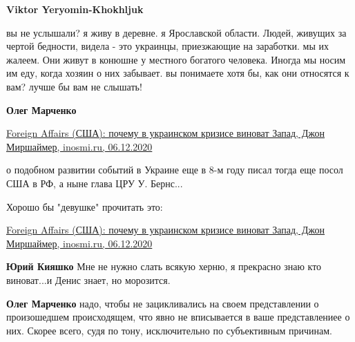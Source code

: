 \begin{itemize}
\begin{itemize}
\textbf{Viktor Yeryomin-Khokhljuk} 

вы не услышали? я живу в деревне. я Ярославской области. Людей, живущих за
чертой бедности, видела - это украинцы, приезжающие на заработки. мы их жалеем.
Они живут в конюшне у местного богатого человека. Иногда мы носим им еду, когда
хозяин о них забывает. вы понимаете хотя бы, как они относятся к вам? лучше бы
вам не слышать!


 
\textbf{Олег Марченко} 

\href{https://inosmi.ru/politic/20201206/222742551.html}{%
Foreign Affairs (США): почему в украинском кризисе виноват Запад, Джон Миршаймер, inosmi.ru, 06.12.2020%
}

о подобном развитии событий в Украине еще в 8-м году писал тогда еще посол США
в РФ, а ныне глава ЦРУ У. Бернс...

 
Хорошо бы "девушке" прочитать это:

\href{https://inosmi.ru/politic/20201206/222742551.html}{%
Foreign Affairs (США): почему в украинском кризисе виноват Запад, Джон Миршаймер, inosmi.ru, 06.12.2020%
}

 
\textbf{Юрий Кияшко} Мне не нужно слать всякую херню, я прекрасно знаю кто виноват...и Денис знает, но морозится.

 
\textbf{Олег Марченко} надо, чтобы не зацикливались на своем представлении о произошедшем происходящем, что явно не вписывается в ваше представлениее о них. Скорее всего, судя по тону, исключительно по субъективным причинам.


\end{itemize}
\end{itemize}
